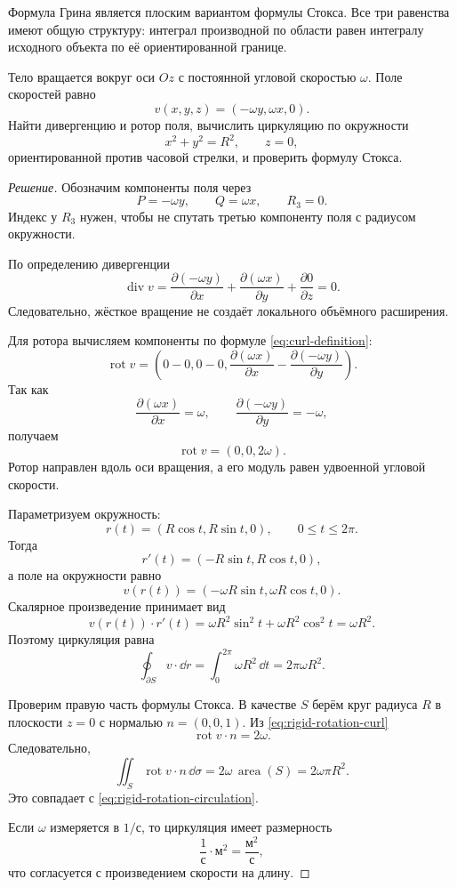 Формула Грина является плоским вариантом формулы Стокса. Все три равенства имеют общую структуру: интеграл производной по области равен интегралу исходного объекта по её ориентированной границе.

\begin{problem}
Тело вращается вокруг оси $Oz$ с постоянной угловой скоростью $\omega$. Поле скоростей равно
\[
v(x,y,z)=(-\omega y,\omega x,0).
\]
Найти дивергенцию и ротор поля, вычислить циркуляцию по окружности
\[
x^2+y^2=R^2,
\qquad z=0,
\]
ориентированной против часовой стрелки, и проверить формулу Стокса.
\end{problem}

\begin{proof}[Решение]
Обозначим компоненты поля через
\[
P=-\omega y,
\qquad
Q=\omega x,
\qquad
R_3=0.
\]
Индекс у $R_3$ нужен, чтобы не спутать третью компоненту поля с радиусом окружности.

По определению дивергенции
\[
\operatorname{div}v
=
\frac{\partial(-\omega y)}{\partial x}
+
\frac{\partial(\omega x)}{\partial y}
+
\frac{\partial0}{\partial z}
=0.
\]
Следовательно, жёсткое вращение не создаёт локального объёмного расширения.

Для ротора вычисляем компоненты по формуле \eqref{eq:curl-definition}:
\[
\operatorname{rot}v
=
\left(
0-0,
0-0,
\frac{\partial(\omega x)}{\partial x}
-
\frac{\partial(-\omega y)}{\partial y}
\right).
\]
Так как
\[
\frac{\partial(\omega x)}{\partial x}=\omega,
\qquad
\frac{\partial(-\omega y)}{\partial y}=-\omega,
\]
получаем
\begin{equation}
\label{eq:rigid-rotation-curl}
\operatorname{rot}v=(0,0,2\omega).
\end{equation}
Ротор направлен вдоль оси вращения, а его модуль равен удвоенной угловой скорости.

Параметризуем окружность:
\[
r(t)=(R\cos t,R\sin t,0),
\qquad
0\leq t\leq2\pi.
\]
Тогда
\[
r'(t)=(-R\sin t,R\cos t,0),
\]
а поле на окружности равно
\[
v(r(t))
=
(-\omega R\sin t,\omega R\cos t,0).
\]
Скалярное произведение принимает вид
\[
v(r(t))\cdot r'(t)
=
\omega R^2\sin^2t+
\omega R^2\cos^2t
=
\omega R^2.
\]
Поэтому циркуляция равна
\begin{equation}
\label{eq:rigid-rotation-circulation}
\oint_{\partial S}v\cdot\dd r
=
\int_0^{2\pi}\omega R^2\,\dd t
=
2\pi\omega R^2.
\end{equation}

Проверим правую часть формулы Стокса. В качестве $S$ берём круг радиуса $R$ в плоскости $z=0$ с нормалью $n=(0,0,1)$. Из \eqref{eq:rigid-rotation-curl}
\[
\operatorname{rot}v\cdot n=2\omega.
\]
Следовательно,
\[
\iint_S
\operatorname{rot}v\cdot n\,\dd\sigma
=
2\omega\,\operatorname{area}(S)
=
2\omega\pi R^2.
\]
Это совпадает с \eqref{eq:rigid-rotation-circulation}.

Если $\omega$ измеряется в $1/\text{с}$, то циркуляция имеет размерность
\[
\frac1{\text{с}}\cdot\text{м}^2
=
\frac{\text{м}^2}{\text{с}},
\]
что согласуется с произведением скорости на длину.
\end{proof}


